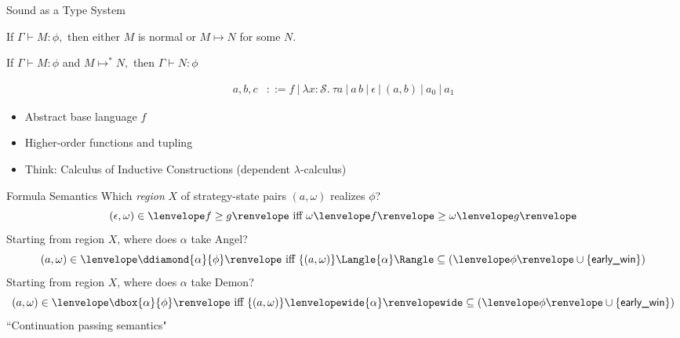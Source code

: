 \documentclass[slidestop,aspectratio=169]{beamer}
\newcommand{\allstate}{\mathcal{S}}
\newcommand{\tint}[2]{#2\lenvelope#1\renvelope}
\newcommand{\fint}[2]{#2\lenvelope#1\renvelope}
\newcommand{\om}{\omega}
\newcommand{\stepsto}{\allowbreak\mapsto\allowbreak}
\newcommand{\bebecomes}{\mathrel{::=}}
\newcommand{\alternative}{~|~}
\newcommand{\stt}{\textsf{early\_win}}
\newcommand{\rzFst}[1]{#1_0}
\newcommand{\rzSnd}[1]{#1_1}
\newcommand{\rzApp}[2]{#1\,#2}
\renewcommand{\aa}{a}
\newcommand{\ab}{b}
\newcommand{\ac}{c}
\newcommand{\rzNil}{\epsilon}
\newcommand{\rzCons}[2]{(#1,#2)}
\newcommand{\rzBLam}[2]{\lambda #1:\allstate.~#2}
\newcommand{\fintR}[1]{\fint{#1}{}} %
\newcommand*{\strategyforR}[2][]{{#2}\Langle{#1}\Rangle}
\newcommand*{\dstrategyforR}[2][]{{#2}\lenvelopewide{#1}\renvelopewide}
\newcommand{\cintR}[1]{\fintR{\bigwedge #1}}
\newcommand{\proves}[3]{#1\allowbreak\vdash #2 \allowbreak \mathop{:} #3}
\newcommand{\G}{\Gamma}
\theoremstyle{plain}
\theoremstyle{definition}
\theoremstyle{remark}
\begin{document}
\begin{frame}[t]{Sound as a Type System}
\begin{lemma}[Progress]
If $\proves{\Gamma}{M}{\phi},$ then either $M$ is normal or $M \stepsto N$ for some $N$.
\end{lemma}
\begin{lemma}[Preservation]
If $\proves{\Gamma}{M}{\phi}$ and $M \stepsto^* N,$ then $\proves{\Gamma}{N}{\phi}$
\end{lemma}
\end{frame}




  \begin{align*}
\aa,\ab,\ac
&\bebecomes f  \alternative \rzBLam{x}{\tau}{\aa} \alternative \rzApp{\aa}{\ab} \alternative  \rzNil \alternative \rzCons{\aa}{\ab}  \alternative \rzFst{\aa} \alternative \rzSnd{\aa}
  \end{align*}
\begin{itemize}
\item Abstract base language $f$
\item Higher-order functions and tupling
\item Think: Calculus of Inductive Constructions (dependent $\lambda$-calculus)
\end{itemize}

\begin{frame}[t]{Formula Semantics}
Which \emph{region} $X$ of strategy-state pairs $(\aa,\om)$ realizes $\phi$?
\[(\rzNil,\om) \in  \fintR{f \geq g} \text{ iff } \tint{f}{\om} \geq \tint{g}{\om}\]
Starting from region $X$, where does $\alpha$ take Angel?
\[(\aa,\om) \in  \fintR{\ddiamond{\alpha}{\phi}} \text{ iff } \strategyforR[\alpha]{\{(\aa,\om)\}} \subseteq (\fintR{\phi} \cup \{\stt\})\]
Starting from region $X$, where does $\alpha$ take Demon?
\[(\aa,\om) \in  \fintR{\dbox{\alpha}{\phi}} \text{ iff } \dstrategyforR[\alpha]{\{(\aa,\om)\}} \subseteq (\fintR{\phi} \cup \{\stt\})\]\pause
``Continuation passing semantics"
\end{frame}
\end{document}
